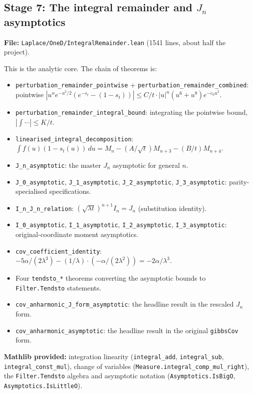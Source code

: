 \documentclass[11pt]{article}
\begin{document}
\subsection{Stage 7: The integral remainder and $J_n$ asymptotics}

\textbf{File:} \texttt{Laplace/OneD/IntegralRemainder.lean} (1541 lines,
about half the project).

This is the analytic core. The chain of theorems is:
\begin{itemize}
\item \texttt{perturbation\_remainder\_pointwise} +
\texttt{perturbation\_remainder\_combined}: pointwise
$|u^n e^{-u^2/2}(e^{-s_t} - (1 - s_t))| \le C/t \cdot |u|^n(u^6 + u^8)e^{-c_0 u^2}$.
\item \texttt{perturbation\_remainder\_integral\_bound}: integrating the
pointwise bound, $|\int \cdots| \le K/t$.
\item \texttt{linearised\_integral\_decomposition}:
$\int f(u)(1 - s_t(u))\,du = M_n - (A/\sqrt t)M_{n+3} - (B/t)M_{n+4}$.
\item \texttt{J\_n\_asymptotic}: the master $J_n$ asymptotic for general
$n$.
\item \texttt{J\_0\_asymptotic}, \texttt{J\_1\_asymptotic},
\texttt{J\_2\_asymptotic}, \texttt{J\_3\_asymptotic}: parity-specialised
specifications.
\item \texttt{I\_n\_J\_n\_relation}:
$(\sqrt{\lambda t})^{n+1} I_n = J_n$ (substitution identity).
\item \texttt{I\_0\_asymptotic}, \texttt{I\_1\_asymptotic},
\texttt{I\_2\_asymptotic}, \texttt{I\_3\_asymptotic}: original-coordinate
moment asymptotics.
\item \texttt{cov\_coefficient\_identity}:
$-5\alpha/(2\lambda^3) - (1/\lambda)\cdot(-\alpha/(2\lambda^2)) = -2\alpha/\lambda^3$.
\item Four \texttt{tendsto\_*} theorems converting the asymptotic bounds
to \texttt{Filter.Tendsto} statements.
\item \texttt{cov\_anharmonic\_J\_form\_asymptotic}: the headline result
in the rescaled $J_n$ form.
\item \texttt{cov\_anharmonic\_asymptotic}: the headline result in the
original \texttt{gibbsCov} form.
\end{itemize}

\textbf{Mathlib provided:} integration linearity (\texttt{integral\_add},
\texttt{integral\_sub}, \texttt{integral\_const\_mul}), change of
variables (\texttt{Measure.integral\_comp\_mul\_right}), the
\texttt{Filter.Tendsto} algebra and asymptotic notation
(\texttt{Asymptotics.IsBigO}, \texttt{Asymptotics.IsLittleO}).
\end{document}
